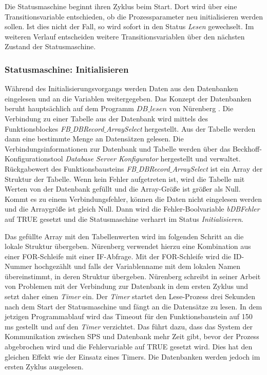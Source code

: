 Die Statusmaschine beginnt ihren Zyklus beim Start. Dort wird über eine Transitionsvariable entschieden, ob die Prozessparameter neu initialisieren werden sollen. Ist dies nicht der Fall, so wird sofort in den Status \textit{Lesen} gewechselt. Im weiteren Verlauf entscheiden weitere Transitionsvariablen über den nächsten Zustand der Statusmaschine.  

\subsubsection*{Statusmaschine: Initialisieren}

Während des Initialisierungsvorgangs werden Daten aus den Datenbanken eingelesen und an die Variablen weitergegeben. Das Konzept der Datenbanken beruht hauptsächlich auf dem Programm $DB\_lesen$ von Nürenberg \citep{Nuerenberg2015}. 
Die Verbindung zu einer Tabelle aus der Datenbank wird mittels des Funktionsblockes \textit{FB$\_$DBRecord$\_$ArraySelect} hergestellt. Aus der Tabelle werden dann eine bestimmte Menge an Datensätzen gelesen. 
Die Verbindungsinformationen zur Datenbank und Tabelle werden über das Beckhoff-Konfigurationstool \textit{Database Server Konfigurator} hergestellt und verwaltet. 
Rückgabewert des Funktionsbausteins \textit{FB$\_$DBRecord$\_$ArraySelect} ist ein Array der Struktur der Tabelle. Wenn kein Fehler aufgetreten ist, wird die Tabelle mit Werten von der Datenbank gefüllt und die Array-Größe ist größer als Null. Kommt es zu einem Verbindungsfehler, können die Daten nicht eingelesen werden und die Arraygröße ist gleich Null. Dann wird die Fehler-Boolvariable \textit{bDBFehler} auf TRUE gesetzt und die Statusmaschine verharrt im Status \textit{Initialisieren}. 

Das gefüllte Array mit den Tabellenwerten wird im folgenden Schritt an die lokale Struktur übergeben. Nürenberg\citep{Nuerenberg2015} verwendet hierzu eine Kombination aus einer FOR-Schleife mit einer IF-Abfrage. Mit der FOR-Schleife wird die ID-Nummer hochgezählt und falls der Variablenname mit dem lokalen Namen übereinstimmt, in deren Struktur übergeben.  
Nürenberg \citep{Nuerenberg2015} schreibt in seiner Arbeit von Problemen mit der Verbindung zur Datenbank in dem ersten Zyklus und setzt daher einen \textit{Timer} ein. Der \textit{Timer} startet den Lese-Prozess drei Sekunden nach dem Start der Statusmaschine und fängt an die Datensätze zu lesen. In dem jetzigen Programmablauf wird das Timeout für den Funktionsbaustein auf 150 ms gestellt und auf den \textit{Timer} verzichtet. Das führt dazu, dass das System der Kommunikation zwischen SPS und Datenbank mehr Zeit gibt, bevor der Prozess abgebrochen wird und die Fehlervariable auf TRUE gesetzt wird. Dies hat den gleichen Effekt wie der Einsatz eines Timers. Die Datenbanken werden jedoch im ersten Zyklus ausgelesen. 

